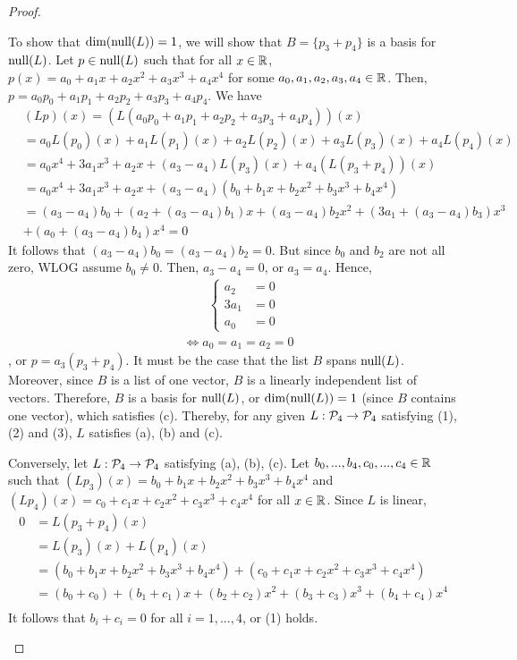 \begin{proof}
\begin{enumerate}[(i)]
        To show that $\dim(\nullla(L))=1$, we will show that $B=\{p_3+p_4\}$ is a basis for $\nullla(L)$.
        Let $p\in\nullla(L)$ such that for all $x\in\R$, $p(x)=a_0+a_1x+a_2x^2+a_3x^3+a_4x^4$ for some $a_0,a_1,a_2,a_3,a_4\in\R$.
        Then, $p=a_0p_0+a_1p_1+a_2p_2+a_3p_3+a_4p_4$. 
        We have 
        \[
            \begin{aligned}
                &(Lp)(x)=(L(a_0p_0+a_1p_1+a_2p_2+a_3p_3+a_4p_4))(x)\\
                &= a_0L(p_0)(x)+a_1L(p_1)(x)+a_2L(p_2)(x)+a_3L(p_3)(x)+a_4L(p_4)(x)\\
                &= a_0x^4+3a_1x^3+a_2x+(a_3-a_4)L(p_3)(x)+a_4(L(p_3+p_4))(x)\\
                &= a_0x^4+3a_1x^3+a_2x+(a_3-a_4)(b_0+b_1x+b_2x^2+b_3x^3+b_4x^4)\\
                &= (a_3-a_4)b_0+(a_2+(a_3-a_4)b_1)x+(a_3-a_4)b_2x^2+(3a_1+(a_3-a_4)b_3)x^3\\
                & +(a_0+(a_3-a_4)b_4)x^4=0
            \end{aligned}
        \]
        It follows that $(a_3-a_4)b_0=(a_3-a_4)b_2=0$. But since $b_0$ and $b_2$ are not all zero, WLOG assume $b_0\not=0$.
        Then, $a_3-a_4=0$, or $a_3=a_4$.
        Hence,
        \begin{align*}
            &\qquad\begin{cases}
                a_2 &= 0\\
                3a_1 &= 0\\
                a_0 &= 0
            \end{cases}\\
            &\iff a_0=a_1=a_2=0
        \end{align*}
        , or $p=a_3(p_3+p_4)$. It must be the case that the list $B$ spans $\nullla(L)$.
        Moreover, since $B$ is a list of one vector, $B$ is a linearly independent list of vectors.
        Therefore, $B$ is a basis for $\nullla(L)$, or $\dim(\nullla(L))=1$ (since $B$ contains one vector), which satisfies (c).
        Thereby, for any given $L:\P_4\rightarrow\P_4$ satisfying (1), (2) and (3), $L$ satisfies (a), (b) and (c).

        Conversely, let $L:\P_4\rightarrow\P_4$ satisfying (a), (b), (c). 
        Let $b_0,...,b_4,c_0,...,c_4\in\R$ such that $(Lp_3)(x)=b_0+b_1x+b_2x^2+b_3x^3+b_4x^4$ and $(Lp_4)(x)=c_0+c_1x+c_2x^2+c_3x^3+c_4x^4$ for all $x\in\R$.
        Since $L$ is linear, 
        \[
            \begin{aligned}
                0&= L(p_3+p_4)(x)\\
                &= L(p_3)(x)+L(p_4)(x)\\
                &= (b_0+b_1x+b_2x^2+b_3x^3+b_4x^4)+(c_0+c_1x+c_2x^2+c_3x^3+c_4x^4)\\
                &= (b_0+c_0)+(b_1+c_1)x+(b_2+c_2)x^2+(b_3+c_3)x^3+(b_4+c_4)x^4\\
            \end{aligned}
        \]
        It follows that $b_i+c_i=0$ for all $i=1,...,4$, or (1) holds.


\end{enumerate}
\end{proof}
